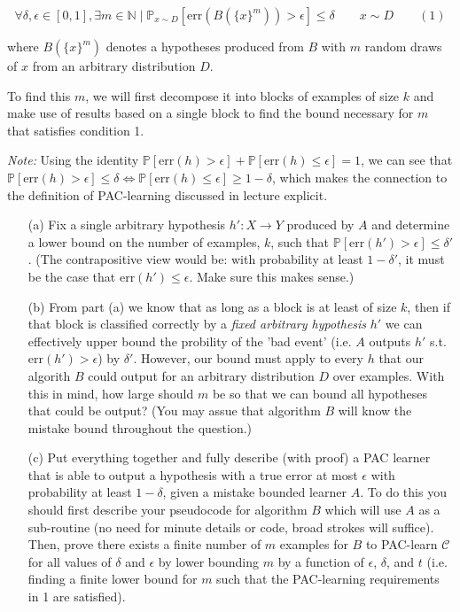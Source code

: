 \documentclass{article}
\begin{document}
\[
\forall \delta, \epsilon \in [0,1], \exists m \in \mathbb{N} \mid \mathbb{P}_{x\sim D}[\text{err}(B(\{x\}^m)) > \epsilon] \leq \delta \qquad x \sim D \qquad (1)
\]

where $B(\{x\}^m)$ denotes a hypotheses produced from $B$ with $m$ random draws of $x$ from an arbitrary distribution $D$.

To find this $m$, we will first decompose it into blocks of examples of size $k$ and make use of results based on a single block to find the bound necessary for $m$ that satisfies condition 1.

\textit{Note:} Using the identity $\mathbb{P}[\text{err}(h) > \epsilon]+\mathbb{P}[\text{err}(h) \leq \epsilon] = 1$, we can see that $\mathbb{P}[\text{err}(h) > \epsilon] \leq \delta \Leftrightarrow \mathbb{P}[\text{err}(h) \leq \epsilon] \geq 1 - \delta$, which makes the connection to the definition of PAC-learning discussed in lecture explicit.

\begin{enumerate}
    \item [(a)] Fix a single arbitrary hypothesis $h' : X \to Y$ produced by $A$ and determine a lower bound on the number of examples, $k$, such that $\mathbb{P}[\text{err}(h') > \epsilon] \leq \delta'$. (The contrapositive view would be: with probability at least $1 - \delta'$, it must be the case that $\text{err}(h') \leq \epsilon$. Make sure this makes sense.)
    
    \item [(b)] From part (a) we know that as long as a block is at least of size $k$, then if that block is classified correctly by a \textit{fixed arbitrary hypothesis} $h'$ we can effectively upper bound the probility of the 'bad event' (i.e. $A$ outputs $h'$ s.t. $\text{err}(h') > \epsilon$) by $\delta'$. However, our bound must apply to every $h$ that our algorith $B$ could output for an arbitrary distribution $D$ over examples. With this in mind, how large should $m$ be so that we can bound all hypotheses that could be output? (You may assue that algorithm $B$ will know the mistake bound throughout the question.)
    
    \item [(c)] Put everything together and fully describe (with proof) a PAC learner that is able to output a hypothesis with a true error at most $\epsilon$ with probability at least $1 - \delta$, given a mistake bounded learner $A$. To do this you should first describe your pseudocode for algorithm $B$ which will use $A$ as a sub-routine (no need for minute details or code, broad strokes will suffice). Then, prove there exists a finite number of $m$ examples for $B$ to PAC-learn $\mathcal{C}$ for all values of $\delta$ and $\epsilon$ by lower bounding $m$ by a function of $\epsilon$, $\delta$, and $t$ (i.e. finding a finite lower bound for $m$ such that the PAC-learning requirements in 1 are satisfied).
\end{enumerate}
\end{document}
